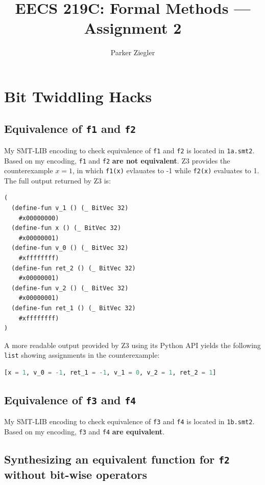 \documentclass{article}
\title{EECS 219C: Formal Methods — Assignment 2}
\author{Parker Ziegler}
\newcommand{\code}[1]{\texttt{#1}}
\begin{document}
\maketitle

\section{Bit Twiddling Hacks}

\subsection{Equivalence of \code{f1} and \code{f2}}

My SMT-LIB encoding to check equivalence of \code{f1} and \code{f2} is located in \code{1a.smt2}. Based on my encoding, \code{f1} and \code{f2} \textbf{are not equivalent}. Z3 provides the counterexample $x = 1$, in which \code{f1(x)} evlauates to -1 while \code{f2(x)} evaluates to 1. The full output returned by Z3 is:

\begin{lstlisting}
(
  (define-fun v_1 () (_ BitVec 32)
    #x00000000)
  (define-fun x () (_ BitVec 32)
    #x00000001)
  (define-fun v_0 () (_ BitVec 32)
    #xffffffff)
  (define-fun ret_2 () (_ BitVec 32)
    #x00000001)
  (define-fun v_2 () (_ BitVec 32)
    #x00000001)
  (define-fun ret_1 () (_ BitVec 32)
    #xffffffff)
)
\end{lstlisting}

A more readable output provided by Z3 using its Python API yields the following \code{list} showing assignments in the counterexample:

\begin{lstlisting}[language=Python]
[x = 1, v_0 = -1, ret_1 = -1, v_1 = 0, v_2 = 1, ret_2 = 1]
\end{lstlisting}

\subsection{Equivalence of \code{f3} and \code{f4}}

My SMT-LIB encoding to check equivalence of \code{f3} and \code{f4} is located in \code{1b.smt2}. Based on my encoding, \code{f3} and \code{f4} \textbf{are equivalent}.

\subsection{Synthesizing an equivalent function for \code{f2} without bit-wise operators}
\end{document}

